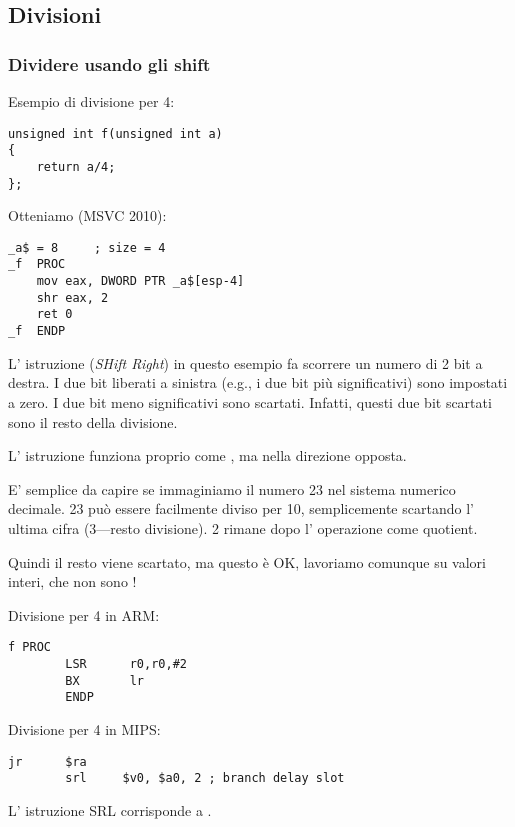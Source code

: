 \subsection{Divisioni}

\subsubsection{Dividere usando gli shift}
\label{division_by_shifting}

Esempio di divisione per 4:

\begin{lstlisting}[style=customc]
unsigned int f(unsigned int a)
{
	return a/4;
};
\end{lstlisting}

Otteniamo (MSVC 2010):

\begin{lstlisting}[caption=MSVC 2010,style=customasmx86]
_a$ = 8		; size = 4
_f	PROC
	mov	eax, DWORD PTR _a$[esp-4]
	shr	eax, 2
	ret	0
_f	ENDP
\end{lstlisting}

\label{SHR}

L' istruzione \SHR (\emph{SHift Right}) in questo esempio fa scorrere un numero di 2 bit a destra.
I due bit liberati a sinistra (e.g., i due bit più significativi) sono impostati a zero.
I due bit meno significativi sono scartati.
Infatti, questi due bit scartati sono il resto della divisione.


L' istruzione \SHR funziona proprio come \SHL, ma nella direzione opposta.



E' semplice da capire se immaginiamo il numero 23 nel sistema numerico decimale.
23 può essere facilmente diviso per 10, semplicemente scartando l' ultima cifra (3---resto divisione). 
2 rimane dopo l' operazione come \gls{quotient}.

Quindi il resto viene scartato, ma questo è OK, lavoriamo comunque su valori interi, 
che non sono !

Divisione per 4 in ARM:

\begin{lstlisting}[caption=\NonOptimizingKeilVI (\ARMMode),style=customasmARM]
f PROC
        LSR      r0,r0,#2
        BX       lr
        ENDP
\end{lstlisting}

Divisione per 4 in MIPS:

\begin{lstlisting}[caption=\Optimizing GCC 4.4.5 (IDA),style=customasmMIPS]
        jr      $ra
        srl     $v0, $a0, 2 ; branch delay slot
\end{lstlisting}

L' istruzione SRL corrisponde a .
